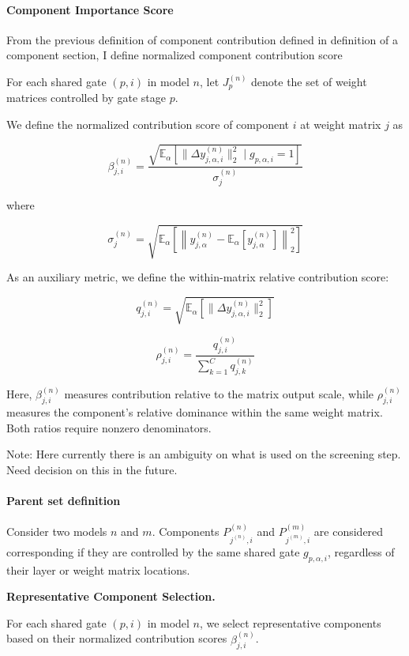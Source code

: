 \documentclass[11pt,a4paper]{article}
\begin{document}
\paragraph{Component Importance Score}
From the previous definition of component contribution defined in definition of a component section, I define normalized component contribution score

For each shared gate $(p,i)$ in model $n$,
let $J_p^{(n)}$ denote the set of weight matrices
controlled by gate stage $p$.

We define the normalized contribution score of component $i$
at weight matrix $j$ as

$$
\beta_{j,i}^{(n)}
=
\frac{
\sqrt{
\mathbb{E}_{\alpha}
\left[
\|\Delta y_{j,\alpha,i}^{(n)}\|_2^2
\mid g_{p,\alpha,i}=1
\right]
}
}{
\sigma_j^{(n)}
}
$$

where

$$
\sigma_j^{(n)}
=
\sqrt{
\mathbb{E}_{\alpha}
\left[
\left\|
y_{j,\alpha}^{(n)}
-
\mathbb{E}_{\alpha}[y_{j,\alpha}^{(n)}]
\right\|_2^2
\right]
}
$$

As an auxiliary metric, we define the within-matrix
relative contribution score:

$$
q_{j,i}^{(n)}
=
\sqrt{
\mathbb{E}_{\alpha}
\left[
\|\Delta y_{j,\alpha,i}^{(n)}\|_2^2
\right]
}
$$

$$
\rho_{j,i}^{(n)}
=
\frac{q_{j,i}^{(n)}}
{\sum_{k=1}^{C}q_{j,k}^{(n)}}
$$

Here, $\beta_{j,i}^{(n)}$ measures contribution relative
to the matrix output scale, while $\rho_{j,i}^{(n)}$
measures the component's relative dominance within
the same weight matrix. Both ratios require nonzero
denominators.

Note: Here currently there is an ambiguity on what is used on the screening step. Need decision on this in the future.

\paragraph{Parent set definition}

Consider two models $n$ and $m$.
Components $P_{j^{(n)},i}^{(n)}$ and
$P_{j^{(m)},i}^{(m)}$ are considered corresponding
if they are controlled by the same shared gate
$g_{p,\alpha,i}$, regardless of their layer
or weight matrix locations.

\textbf{Representative Component Selection.}

For each shared gate $(p,i)$ in model $n$,
we select representative components based on
their normalized contribution scores
$\beta_{j,i}^{(n)}$.
\end{document}
